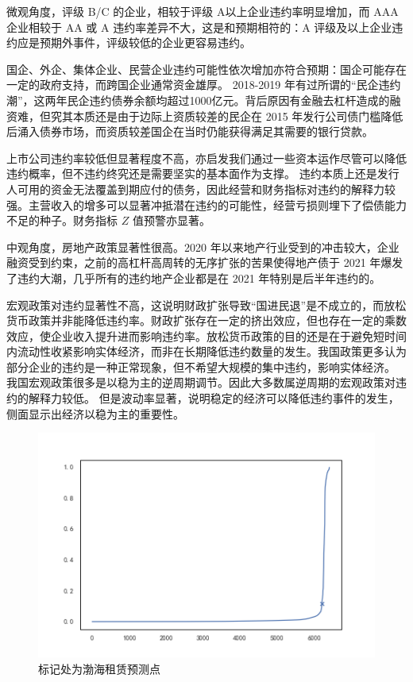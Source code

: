 
微观角度，评级 B/C 的企业，相较于评级 A以上企业违约率明显增加，而 AAA 企业相较于 AA 或 A 违约率差异不大，这是和预期相符的：A 评级及以上企业违约应是预期外事件，评级较低的企业更容易违约。

国企、外企、集体企业、民营企业违约可能性依次增加亦符合预期：国企可能存在一定的政府支持\autocite{mo2021china}，而跨国企业通常资金雄厚。
2018-2019 年有过所谓的“民企违约潮”，这两年民企违约债券余额均超过1000亿元。背后原因有金融去杠杆造成的融资难，但究其本质还是由于边际上资质较差的民企在 2015 年发行公司债门槛降低后涌入债券市场，而资质较差国企在当时仍能获得满足其需要的银行贷款。

上市公司违约率较低但显著程度不高，亦启发我们通过一些资本运作尽管可以降低违约概率，但不违约终究还是需要坚实的基本面作为支撑。
违约本质上还是发行人可用的资金无法覆盖到期应付的债务，因此经营和财务指标对违约的解释力较强。主营收入的增多可以显著冲抵潜在违约的可能性，经营亏损则埋下了偿债能力不足的种子。财务指标 \(Z\) 值预警亦显著。

中观角度，房地产政策显著性很高。2020 年以来地产行业受到的冲击较大，企业融资受到约束，之前的高杠杆高周转的无序扩张的苦果使得地产债于 2021 年爆发了违约大潮，几乎所有的违约地产企业都是在 2021 年特别是后半年违约的。

宏观政策对违约显著性不高，这说明财政扩张导致“国进民退”是不成立的，而放松货币政策并非能降低违约率。财政扩张存在一定的挤出效应，但也存在一定的乘数效应，使企业收入提升进而影响违约率。放松货币政策的目的还是在于避免短时间内流动性收紧影响实体经济，而非在长期降低违约数量的发生。我国政策更多认为部分企业的违约是一种正常现象，但不希望大规模的集中违约，影响实体经济。
我国宏观政策很多是以稳为主的逆周期调节。因此大多数属逆周期的宏观政策对违约的解释力较低。
但是波动率显著，说明稳定的经济可以降低违约事件的发生，侧面显示出经济以稳为主的重要性。
\begin{figure}[h]
	\centering
	\includegraphics[width=0.9\linewidth]{./data/渤海银行.png}
	\caption{标记处为渤海租赁预测点}
	\label{fig:bhyh}
\end{figure}


